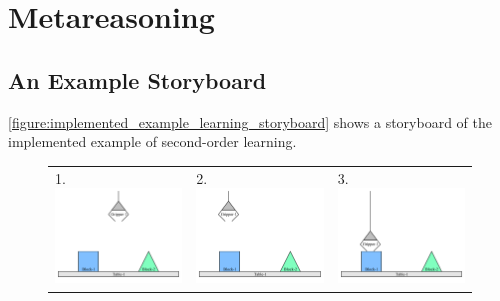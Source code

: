 \chapter{Metareasoning}
\label{chapter:metareasoning}

\section{An Example Storyboard}

{\mbox{\autoref{figure:implemented_example_learning_storyboard}}}
shows a storyboard of the implemented example of second-order
learning.
\begin{figure}
\begin{center}
\begin{tabular}{p{4cm}p{4cm}p{4cm}}
1. \includegraphics[width=4cm]{gfx/blocks_world_example-1}  & 2. \includegraphics[width=4cm]{gfx/blocks_world_example-2}  & 3. \includegraphics[width=4cm]{gfx/blocks_world_example-3} \\

\end{tabular}
\end{center}
\end{figure}
